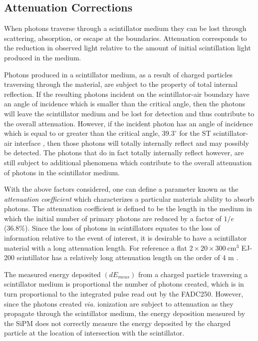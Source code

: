 \subsection{Attenuation Corrections} \label{sec:calib_ac}

When photons traverse through a scintillator medium they can be lost through scattering, absorption, or escape at the boundaries.  Attenuation corresponds to the reduction in observed light relative to the amount of initial scintillation light produced in the medium.

Photons produced in a scintillator medium, as a result of charged particles traversing through the material,  are subject to the property of total internal reflection.  If the resulting photons incident on the scintillator-air boundary have an angle of incidence which is smaller than the critical angle, then the photons will leave the scintillator medium and be lost for detection and thus contribute to the overall attenuation.  However, if the incident  photon has an angle of incidence which is equal to or greater than the critical angle, $39.3^{\circ}$ for the ST scintillator-air interface \cite{pooser16}, then those photons will totally internally reflect and may possibly be detected.  The photons that do in fact totally internally reflect however, are still subject to additional phenomena which contribute to the overall attenuation of photons in the scintillator medium.  

With the above factors considered, one can define a parameter known as the \textit{attenuation coefficient} which characterizes a particular materials ability to absorb photons. The attenuation coefficient is defined to be the length in the medium in which the initial number of primary  photons are reduced by a factor of $1/e$ (36.8\%).  Since the loss of photons in scintillators equates to the loss of information relative to the event of interest, it is desirable to have a scintillator material with a long attenuation length.  For reference a flat $2 \times 20 \times 300\ \mathrm{cm^{3}}$ EJ-200 scintillator has a relatively long attenuation length on the order of 4 m \cite{ej200_specs}.

The measured energy deposited $(dE_{meas})$ from a charged particle traversing a scintillator medium is proportional the number of photons created, which is in turn proportional to the integrated pulse read out by the FADC250.  However, since the photons created \textit{via.} ionization are subject to attenuation as they propagate through the scintillator medium, the energy deposition measured by the SiPM does not correctly measure the energy deposited by the charged particle at the location of intersection with the scintillator.  

